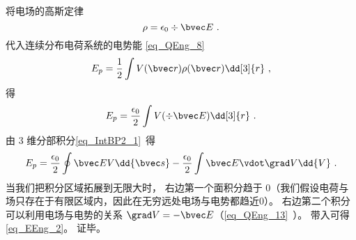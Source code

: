 将电场的高斯定律
\begin{equation}
\rho = \epsilon_0\div \bvec E~.
\end{equation}
代入连续分布电荷系统的电势能 \autoref{eq_QEng_8}~
\begin{equation}
E_p = \frac 12 \int V(\bvec r) \rho(\bvec r) \dd[3]{r}~,
\end{equation}
得
\begin{equation}
E_p = \frac{\epsilon_0}2 \int V (\div \bvec E) \dd[3]{r}~.
\end{equation}
由 3 维分部积分\autoref{eq_IntBP2_1}~得
\begin{equation}
E_p = \frac{\epsilon_0}2 \oint \bvec E V \dd{\bvec s} - \frac{\epsilon_0}{2} \int \bvec E \vdot \grad V \dd{V}~.
\end{equation}
当我们把积分区域拓展到无限大时， 右边第一个面积分趋于 0（我们假设电荷与场只存在于有限区域内，因此在无穷远处电场与电势都趋近$0$）。 右边第二个积分可以利用电场与电势的关系 $\grad V = -\bvec E$（\autoref{eq_QEng_13}~）。 带入可得\autoref{eq_EEng_2}。 证毕。
